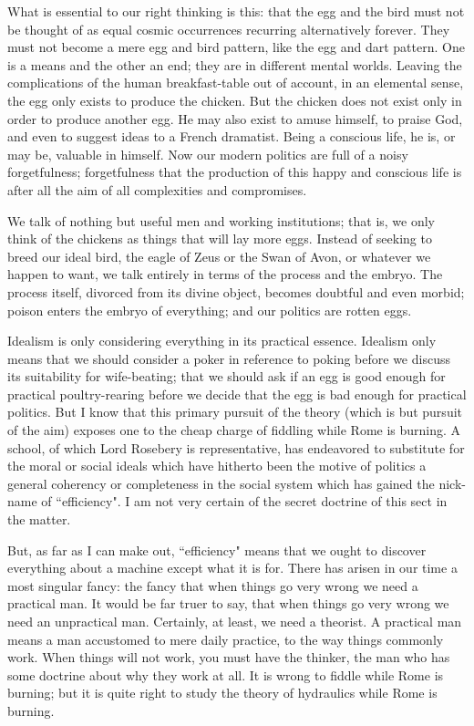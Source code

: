 \documentclass[final,10pt,letterpaper,twocolumn,openany]{book}
\begin{document}
What is essential to
our right thinking is this: that the egg and the bird must not be thought of
as equal cosmic occurrences recurring alternatively forever. They must not
become a mere egg and bird pattern, like the egg and dart pattern. One is a
means and the other an end; they are in different mental worlds. Leaving
the complications of the human breakfast-table out of account, in an
elemental sense, the egg only exists to produce the chicken. But the
chicken does not exist only in order to produce another egg. He may also
exist to amuse himself, to praise God, and even to suggest ideas to a
French dramatist. Being a conscious life, he is, or may be, valuable in
himself. Now our modern politics are full of a noisy forgetfulness;
forgetfulness that the production of this happy and conscious life is after
all the aim of all complexities and compromises. 

We talk of nothing but
useful men and working institutions; that is, we only think of the chickens
as things that will lay more eggs. Instead of seeking to breed our ideal bird,
the eagle of Zeus or the Swan of Avon, or whatever we happen to want,
we talk entirely in terms of the process and the embryo. The process itself,
divorced from its divine object, becomes doubtful and even morbid;
poison enters the embryo of everything; and our politics are rotten eggs.

     Idealism is only considering everything in its practical essence.
Idealism only means that we should consider a poker in reference to
poking before we discuss its suitability for wife-beating; that we should
ask if an egg is good enough for practical poultry-rearing before we decide
that the egg is bad enough for practical politics. But I know that this
primary pursuit of the theory (which is but pursuit of the aim) exposes one
to the cheap charge of fiddling while Rome is burning. A school, of which
Lord Rosebery is representative, has endeavored to substitute for the
moral or social ideals which have hitherto been the motive of politics a
general coherency or completeness in the social system which has gained
the nick-name of ``efficiency". I am not very certain of the secret doctrine
of this sect in the matter. 

But, as far as I can make out, ``efficiency" means
that we ought to discover everything about a machine except what it is for.
There has arisen in our time a most singular fancy: the fancy that when
things go very wrong we need a practical man. It would be far truer to say,
that when things go very wrong we need an unpractical man. Certainly, at
least, we need a theorist. A practical man means a man accustomed to
mere daily practice, to the way things commonly work. When things will
not work, you must have the thinker, the man who has some doctrine
about why they work at all. It is wrong to fiddle while Rome is burning;
but it is quite right to study the theory of hydraulics while Rome is
burning.
\end{document}
